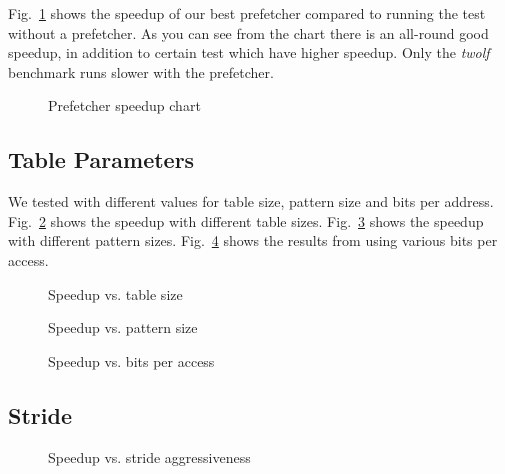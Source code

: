 Fig.~\ref{fig:prefetcher_speedup} shows the speedup of our best prefetcher
compared to running the test without a prefetcher. As you can see from the
chart there is an all-round good speedup, in addition to certain test which
have higher speedup. Only the \emph{twolf} benchmark runs slower with the
prefetcher.

\begin{figure}
	
	\caption{Prefetcher speedup chart}
	\label{fig:prefetcher_speedup}
\end{figure}

\subsection{Table Parameters}
We tested with different values for table size, pattern size and bits per address.
Fig.~\ref{fig:table_size_chart} shows the speedup with different table sizes.
Fig.~\ref{fig:pattern_size} shows the speedup with different pattern sizes.
Fig.~\ref{fig:bits} shows the results from using various bits per access.

\begin{figure}
	
	\caption{Speedup vs. table size}
	\label{fig:table_size_chart}
\end{figure}

\begin{figure}
	
	\caption{Speedup vs. pattern size}
	\label{fig:pattern_size}
\end{figure}

\begin{figure}
	
	\caption{Speedup vs. bits per access}
	\label{fig:bits}
\end{figure}

\subsection{Stride}

\begin{figure}
	
	\caption{Speedup vs. stride aggressiveness}
	\label{fig:aggr}
\end{figure}

